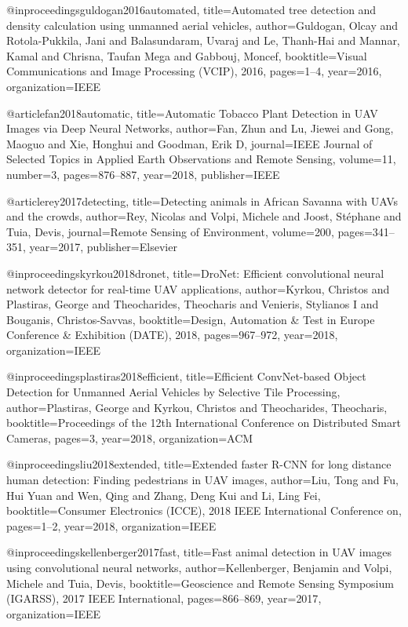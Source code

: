 @inproceedings{guldogan2016automated,
  title={Automated tree detection and density calculation using unmanned aerial vehicles},
  author={Guldogan, Olcay and Rotola-Pukkila, Jani and Balasundaram, Uvaraj and Le, Thanh-Hai and Mannar, Kamal and Chrisna, Taufan Mega and Gabbouj, Moncef},
  booktitle={Visual Communications and Image Processing (VCIP), 2016},
  pages={1--4},
  year={2016},
  organization={IEEE}
}

@article{fan2018automatic,
  title={Automatic Tobacco Plant Detection in UAV Images via Deep Neural Networks},
  author={Fan, Zhun and Lu, Jiewei and Gong, Maoguo and Xie, Honghui and Goodman, Erik D},
  journal={IEEE Journal of Selected Topics in Applied Earth Observations and Remote Sensing},
  volume={11},
  number={3},
  pages={876--887},
  year={2018},
  publisher={IEEE}
}

@article{rey2017detecting,
  title={Detecting animals in African Savanna with UAVs and the crowds},
  author={Rey, Nicolas and Volpi, Michele and Joost, St{\'e}phane and Tuia, Devis},
  journal={Remote Sensing of Environment},
  volume={200},
  pages={341--351},
  year={2017},
  publisher={Elsevier}
}

@inproceedings{kyrkou2018dronet,
  title={DroNet: Efficient convolutional neural network detector for real-time UAV applications},
  author={Kyrkou, Christos and Plastiras, George and Theocharides, Theocharis and Venieris, Stylianos I and Bouganis, Christos-Savvas},
  booktitle={Design, Automation \& Test in Europe Conference \& Exhibition (DATE), 2018},
  pages={967--972},
  year={2018},
  organization={IEEE}
}

@inproceedings{plastiras2018efficient,
  title={Efficient ConvNet-based Object Detection for Unmanned Aerial Vehicles by Selective Tile Processing},
  author={Plastiras, George and Kyrkou, Christos and Theocharides, Theocharis},
  booktitle={Proceedings of the 12th International Conference on Distributed Smart Cameras},
  pages={3},
  year={2018},
  organization={ACM}
}

@inproceedings{liu2018extended,
  title={Extended faster R-CNN for long distance human detection: Finding pedestrians in UAV images},
  author={Liu, Tong and Fu, Hui Yuan and Wen, Qing and Zhang, Deng Kui and Li, Ling Fei},
  booktitle={Consumer Electronics (ICCE), 2018 IEEE International Conference on},
  pages={1--2},
  year={2018},
  organization={IEEE}
}

@inproceedings{kellenberger2017fast,
  title={Fast animal detection in UAV images using convolutional neural networks},
  author={Kellenberger, Benjamin and Volpi, Michele and Tuia, Devis},
  booktitle={Geoscience and Remote Sensing Symposium (IGARSS), 2017 IEEE International},
  pages={866--869},
  year={2017},
  organization={IEEE}
}

